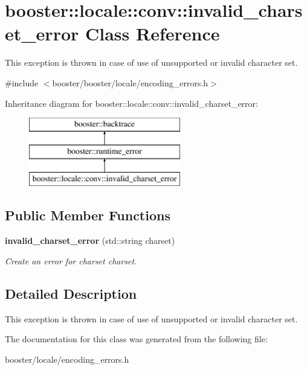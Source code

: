 \section{booster\-:\-:locale\-:\-:conv\-:\-:invalid\-\_\-charset\-\_\-error \-Class \-Reference}
\label{classbooster_1_1locale_1_1conv_1_1invalid__charset__error}


\-This exception is thrown in case of use of unsupported or invalid character set.  




{\ttfamily \#include $<$booster/booster/locale/encoding\-\_\-errors.\-h$>$}

\-Inheritance diagram for booster\-:\-:locale\-:\-:conv\-:\-:invalid\-\_\-charset\-\_\-error\-:\begin{figure}[H]
\begin{center}
\leavevmode
\includegraphics[height=3.000000cm]{classbooster_1_1locale_1_1conv_1_1invalid__charset__error}
\end{center}
\end{figure}
\subsection*{\-Public \-Member \-Functions}
\begin{DoxyCompactItemize}
\item 
{\bf invalid\-\_\-charset\-\_\-error} (std\-::string charset)\label{classbooster_1_1locale_1_1conv_1_1invalid__charset__error_a80039183bc0c89b03e70e832ad7f1477}

\begin{DoxyCompactList}\small\item\em \-Create an error for charset {\itshape charset\/}. \end{DoxyCompactList}\end{DoxyCompactItemize}


\subsection{\-Detailed \-Description}
\-This exception is thrown in case of use of unsupported or invalid character set. 

\-The documentation for this class was generated from the following file\-:\begin{DoxyCompactItemize}
\item 
booster/locale/encoding\-\_\-errors.\-h\end{DoxyCompactItemize}
